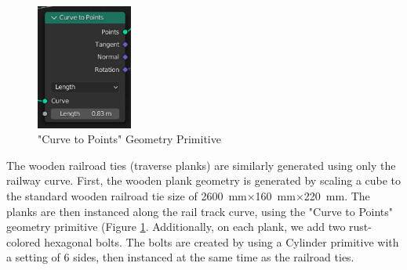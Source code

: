 \begin{figure}
    \centering
    \includegraphics[width=0.28\textwidth]{src/img/procedural-tracks/2c-planks-curve-to-points.jpg}
     \caption{"Curve to Points" Geometry Primitive}
     \label{fig:curve-to-points}
\end{figure}

The wooden railroad ties (traverse planks) are similarly generated using only the railway curve. First, the wooden plank geometry is generated by scaling a cube to the standard wooden railroad tie size of 2600 mm×160 mm×220 mm. The planks are then instanced along the rail track curve, using the "Curve to Points" geometry primitive (Figure \ref{fig:curve-to-points}. Additionally, on each plank, we add two rust-colored hexagonal bolts. The bolts are created by using a Cylinder primitive with a setting of 6 sides, then instanced at the same time as the railroad ties.

